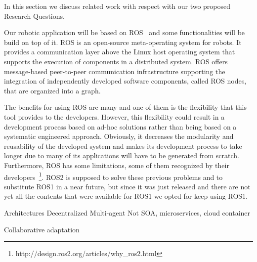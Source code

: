 In this section we discuss related work with respect with our two proposed Research Questions.

Our robotic application will be based on ROS~\cite{Quigley2009} and some functionalities will be build on top of it. 
ROS is an open-source meta-operating system for robots. 
It provides a communication layer above the Linux host operating system that supports the execution of components in a distributed system. 
ROS offers message-based peer-to-peer communication infrastructure supporting the integration of independently developed software components, called ROS nodes, that are organized into a graph.

The benefits for using ROS are many and one of them is the flexibility that this tool provides to the developers.
However, this flexibility could result in a development process based on ad-hoc solutions rather than being based on a systematic engineered approach. 
Obviously, it decreases the modularity and reusability of the developed system and makes its development process to take longer due to many of its applications will have to be generated from scratch. 
Furthermore, ROS has some limitations, some of them recognized by their developers~\footnote{http://design.ros2.org/articles/why\_ros2.html}.
ROS2 is supposed to solve these previous problems and to substitute ROS1 in a near future, but since it was just released and there are not yet all the contents that were available for ROS1 we opted for keep using ROS1.

Architectures
	Decentralized
	Multi-agent
	Not SOA, microservices, cloud container

Collaborative adaptation
